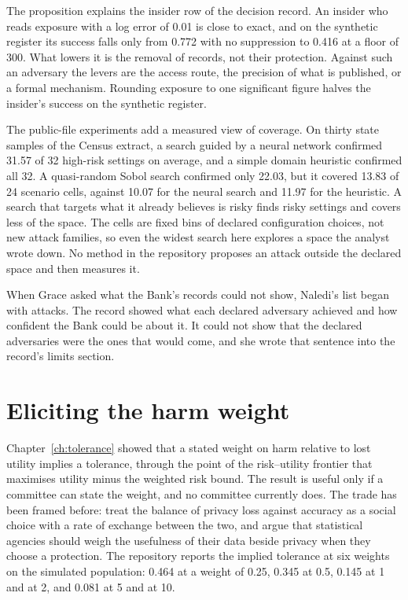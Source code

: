 The proposition explains the insider row of the decision record. An insider who reads
exposure with a log error of 0.01 is close to exact, and on the synthetic register its
success falls only from 0.772 with no suppression to 0.416 at a floor of 300.
What lowers it is the removal of records, not their protection. Against such an
adversary the levers are the access route, the precision of what is published, or a
formal mechanism. Rounding exposure to one significant figure halves the insider's
success on the synthetic register. %

The public-file experiments add a measured view of coverage. On thirty state samples
of the Census extract, a search guided by a neural network confirmed 31.57 of 32
high-risk settings on average, and a simple domain heuristic confirmed all 32. A
quasi-random Sobol search confirmed only 22.03, but it covered 13.83 of 24 scenario
cells, against 10.07 for the neural search and 11.97 for the heuristic.
A search that targets what it already believes is risky finds risky settings and
covers less of the space. The cells are fixed bins of declared configuration choices,
not new attack families, so even the widest search here explores a space the analyst
wrote down. No method in the repository proposes an attack outside the declared space
and then measures it.

When Grace asked what the Bank's records could not show, Naledi's list began with
attacks. The record showed what each declared adversary achieved and how confident
the Bank could be about it. It could not show that the declared adversaries were the
ones that would come, and she wrote that sentence into the record's limits section.

\section{Eliciting the harm weight}

Chapter~\ref{ch:tolerance} showed that a stated weight on harm relative to lost
utility implies a tolerance, through the point of the risk--utility frontier that
maximises utility minus the weighted risk bound. The result is useful only if a
committee can state the weight, and no committee currently does. The trade has been
framed before: \citet{abowd2019} treat the balance of privacy loss against accuracy as
a social choice with a rate of exchange between the two, and \citet{hotz2022} argue
that statistical agencies should weigh the usefulness of their data beside privacy
when they choose a protection. The repository
reports the implied tolerance at six weights on the simulated population: 0.464 at a
weight of 0.25, 0.345 at 0.5, 0.145 at 1 and at 2, and 0.081 at 5 and at 10.

